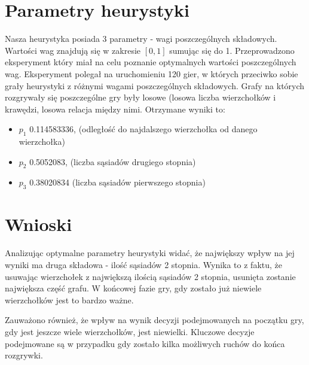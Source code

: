 \documentclass[11pt,a4paper]{article}
\begin{document}
\section{Parametry heurystyki}
Nasza heurystyka posiada 3 parametry - wagi poszczególnych składowych. Wartości wag znajdują się w zakresie $[0,1]$ sumując się do 1. Przeprowadzono eksperyment który miał na celu poznanie optymalnych wartości poszczególnych wag. Eksperyment polegał na uruchomieniu 120 gier, w których przeciwko sobie grały heurystyki z różnymi wagami poszczególnych składowych. Grafy na których rozgrywały się poszczególne gry były losowe (losowa liczba wierzchołków i krawędzi, losowa relacja między nimi. Otrzymane wyniki to:
\begin{itemize}
\item $p_1$ 0.114583336, (odległość do najdalszego wierzchołka od danego wierzchołka)
\item $p_2$ 0.5052083, (liczba sąsiadów drugiego stopnia)
\item $p_3$ 0.38020834 (liczba sąsiadów pierwszego stopnia)
\end{itemize}

\section{Wnioski}
Analizując optymalne parametry heurystyki widać, że największy wpływ na jej wyniki ma druga składowa - ilość sąsiadów 2 stopnia. Wynika to z faktu, że usuwając wierzchołek z największą ilością sąsiadów 2 stopnia, usunięta zostanie największa część grafu. W końcowej fazie gry, gdy zostało już niewiele wierzchołków jest to bardzo ważne.

Zauważono również, że wpływ na wynik decyzji podejmowanych na początku gry, gdy jest jeszcze wiele wierzchołków, jest niewielki. Kluczowe decyzje podejmowane są w przypadku gdy zostało kilka możliwych ruchów do końca rozgrywki. 
\end{document}
